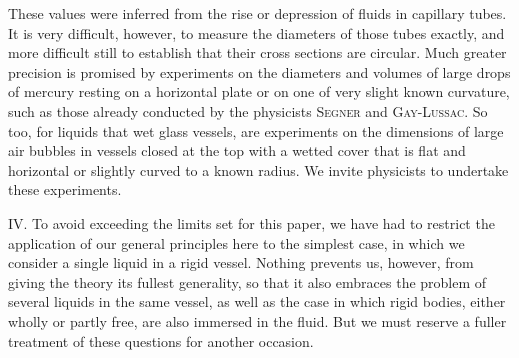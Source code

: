 These values were inferred from the rise or depression of fluids in capillary tubes. It is very difficult, however, to measure the diameters of those tubes exactly, and more difficult still to establish that their cross sections are circular. Much greater precision is promised by experiments on the diameters and volumes of large drops of mercury resting on a horizontal plate or on one of very slight known curvature, such as those already conducted by the physicists \textsc{Segner} and \textsc{Gay-Lussac}. So too, for liquids that wet glass vessels, are experiments on the dimensions of large air bubbles in vessels closed at the top with a wetted cover that is flat and horizontal or slightly curved to a known radius. We invite physicists to undertake these experiments.

IV. To avoid exceeding the limits set for this paper, we have had to restrict the application of our general principles here to the simplest case, in which we consider a single liquid in a rigid vessel. Nothing prevents us, however, from giving the theory its fullest generality, so that it also embraces the problem of several liquids in the same vessel, as well as the case in which rigid bodies, either wholly or partly free, are also immersed in the fluid. But we must reserve a fuller treatment of these questions for another occasion.
